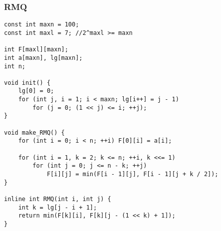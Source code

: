 \subsubsection{RMQ}
\begin{verbatim}
const int maxn = 100;
const int maxl = 7; //2^maxl >= maxn

int F[maxl][maxn];
int a[maxn], lg[maxn];
int n;

void init() {
    lg[0] = 0;
    for (int j, i = 1; i < maxn; lg[i++] = j - 1)
        for (j = 0; (1 << j) <= i; ++j);
}

void make_RMQ() {
    for (int i = 0; i < n; ++i) F[0][i] = a[i];

    for (int i = 1, k = 2; k <= n; ++i, k <<= 1)
        for (int j = 0; j <= n - k; ++j)
            F[i][j] = min(F[i - 1][j], F[i - 1][j + k / 2]);
}

inline int RMQ(int i, int j) {
    int k = lg[j - i + 1];
    return min(F[k][i], F[k][j - (1 << k) + 1]);
}
\end{verbatim}

